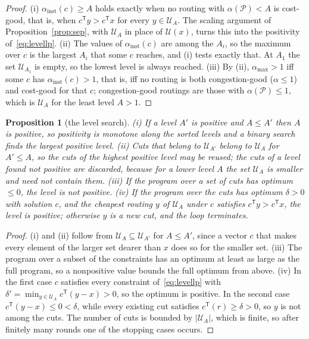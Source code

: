\documentclass[11pt]{article}
\newtheorem{proposition}{Proposition}
\theoremstyle{remark}
\begin{document}
\begin{proof}
(i) $\alpha_{\mathrm{inst}}(c)\ge A$ holds exactly when no routing with $\alpha(\mathcal P)<A$ is cost-good, that is, when $c^{\mathsf T}y>c^{\mathsf T}x$ for every $y\in\mathcal U_A$. The scaling argument of
Proposition~\ref{prop:sep}, with $\mathcal U_A$ in place of $\mathcal U(x)$, turns this into the positivity of~\eqref{eq:levellp}. (ii) The values of $\alpha_{\mathrm{inst}}(c)$ are among the $A_i$, so the maximum over $c$ is the
largest $A_i$ that some $c$ reaches, and (i) tests exactly that. At $A_1$ the set $\mathcal U_{A_1}$ is empty, so the lowest level is always reached. (iii) By (ii), $\alpha_{\max}>1$ iff some $c$ has $\alpha_{\mathrm{inst}}(c)>1$, that is, iff
no routing is both congestion-good ($\alpha\le1$) and cost-good for that $c$; congestion-good routings are those with $\alpha(\mathcal P)\le1$, which is $\mathcal U_A$ for the least level $A>1$.
\end{proof}

\begin{proposition}[the level search]
\label{prop:cp}
(i) If a level $A'$ is positive and $A\le A'$ then $A$ is positive, so positivity is monotone along the sorted levels and a binary search finds the largest positive level.
(ii) Cuts that belong to $\mathcal U_{A'}$ belong to $\mathcal U_A$ for $A'\le A$, so the cuts of the highest positive level may be reused; the cuts of a level found not positive are discarded, because for a lower level $A$ the set $\mathcal U_A$ is smaller and need not contain them. (iii) If the program over a set of cuts has optimum $\le0$, the level is not positive.
(iv) If the program over the cuts has optimum $\delta>0$ with solution $c$, and the cheapest routing $y$ of $\mathcal U_A$ under $c$ satisfies $c^{\mathsf T}y>c^{\mathsf T}x$, the level is positive; otherwise $y$ is a new cut, and the loop terminates.
\end{proposition}

\begin{proof}
(i) and (ii) follow from $\mathcal U_A\subseteq\mathcal U_{A'}$ for $A\le A'$, since a vector $c$ that makes every element of the larger set dearer than $x$ does so for the smaller set. (iii) The program over a subset of the constraints has an optimum at
least as large as the full program, so a nonpositive value bounds the full optimum from above. (iv) In the first case $c$ satisfies every constraint of~\eqref{eq:levellp} with $\delta'=\min_{y\in\mathcal U_A}c^{\mathsf T}(y-x)>0$, so the optimum
is positive. In the second case $c^{\mathsf T}(y-x)\le0<\delta$, while every existing cut satisfies $c^{\mathsf T}(r)\ge\delta>0$, so $y$ is not among the cuts. The number of cuts is bounded by $|\mathcal U_A|$, which is finite, so after finitely many
rounds one of the stopping cases occurs.
\end{proof}
\end{document}
